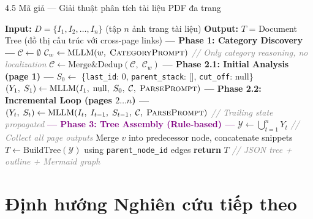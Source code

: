 \documentclass[aspectratio=1610,8pt]{beamer}
\begin{document}
\begin{frame}{4.5 \; Mã giả — Giải thuật phân tích tài liệu PDF đa trang}
    {\small
    \begin{algorithmic}
    \STATE \textbf{Input:} $D = \{I_1, I_2, \ldots, I_n\}$ (tập $n$ ảnh trang tài liệu)
    \STATE \textbf{Output:} $T$ = Document Tree (đồ thị cấu trúc với cross-page links)
    \STATE
    \STATE \textcolor{warnorange}{\textbf{--- Phase 1: Category Discovery ---}}
    \STATE $\mathcal{C} \leftarrow \emptyset$
        \STATE $\mathcal{C}_w \leftarrow \text{MLLM}(w,\; \textsc{CategoryPrompt})$ \hfill \textcolor{gray}{\textit{// Only category reasoning, no localization}}
        \STATE $\mathcal{C} \leftarrow \text{Merge\&Dedup}(\mathcal{C},\; \mathcal{C}_w)$
    \ENDFOR
    \STATE
    \STATE \textcolor{successgreen}{\textbf{--- Phase 2.1: Initial Analysis (page 1) ---}}
    \STATE $S_0 \leftarrow$ \{\texttt{last\_id}: 0, \texttt{parent\_stack}: [], \texttt{cut\_off}: null\}
    \STATE $(Y_1,\; S_1) \leftarrow \text{MLLM}(I_1,\; \text{null},\; S_0,\; \mathcal{C},\; \textsc{ParsePrompt})$
    \STATE
    \STATE \textcolor{successgreen}{\textbf{--- Phase 2.2: Incremental Loop (pages $2 \ldots n$) ---}}
        \STATE $(Y_t,\; S_t) \leftarrow \text{MLLM}(I_t,\; I_{t-1},\; S_{t-1},\; \mathcal{C},\; \textsc{ParsePrompt})$
        \hfill \textcolor{gray}{\textit{// Trailing state propagated}}
    \ENDFOR
    \STATE
    \STATE \textcolor{purple}{\textbf{--- Phase 3: Tree Assembly (Rule-based) ---}}
    \STATE $\mathcal{Y} \leftarrow \bigcup_{t=1}^{n} Y_t$ \hfill \textcolor{gray}{\textit{// Collect all page outputs}}
        \STATE Merge $v$ into predecessor node, concatenate snippets
    \ENDFOR
    \STATE $T \leftarrow \text{BuildTree}(\mathcal{Y})$ using \texttt{parent\_node\_id} edges
    \STATE \textbf{return} $T$ \hfill \textcolor{gray}{\textit{// JSON tree + outline + Mermaid graph}}
    \end{algorithmic}
    }
\end{frame}

\section{Định hướng Nghiên cứu tiếp theo}
\end{document}
